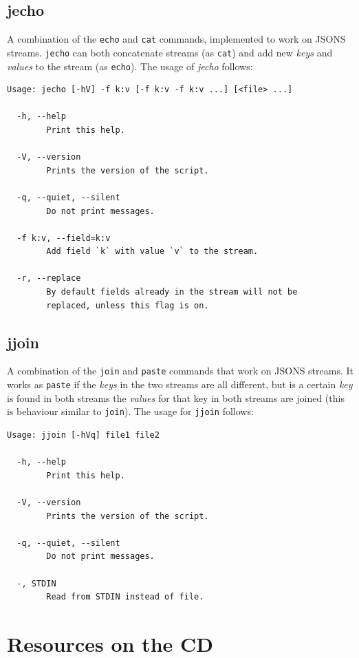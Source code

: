 \documentclass[11pt,a4paper,twoside,openright,draft]{report}
\begin{document}
\section{jecho}

A combination of the \texttt{echo} and \texttt{cat} commands, implemented to
work on JSONS streams.  \texttt{jecho} can both concatenate streams (as
\texttt{cat}) and add new \emph{keys} and \emph{values} to the stream (as
\texttt{echo}).  The usage of \emph{jecho} follows:

{\small
\begin{Verbatim}[samepage=true]
Usage: jecho [-hV] -f k:v [-f k:v -f k:v ...] [<file> ...]

  -h, --help
        Print this help.

  -V, --version
        Prints the version of the script.

  -q, --quiet, --silent
        Do not print messages.

  -f k:v, --field=k:v
        Add field `k` with value `v` to the stream.

  -r, --replace
        By default fields already in the stream will not be
        replaced, unless this flag is on.
\end{Verbatim}
}

\section{jjoin}

A combination of the \texttt{join} and \texttt{paste} commands that work on
JSONS streams.  It works as \texttt{paste} if the \emph{keys} in the two
streams are all different, but is a certain \emph{key} is found in both streams
the \emph{values} for that key in both streams are joined (this is behaviour
similar to \texttt{join}).  The usage for \texttt{jjoin} follows:

{\small
\begin{Verbatim}[samepage=true]
Usage: jjoin [-hVq] file1 file2

  -h, --help
        Print this help.

  -V, --version
        Prints the version of the script.

  -q, --quiet, --silent
        Do not print messages.

  -, STDIN
        Read from STDIN instead of file.
\end{Verbatim}
}

\chapter{Resources on the CD}
\label{chap:resources}
\end{document}
